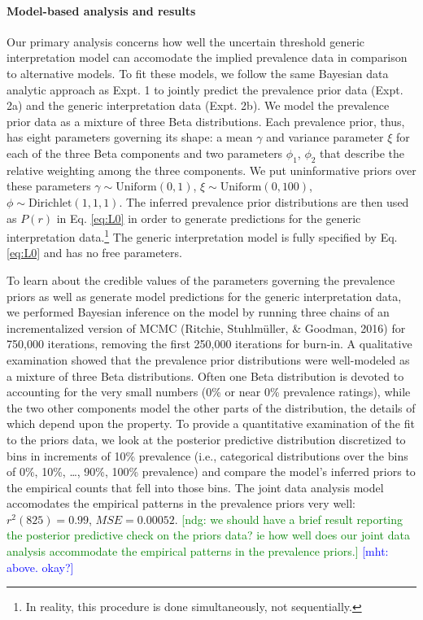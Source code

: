 \documentclass[,man,floatsintext]{apa6}
\let\oldparagraph\paragraph
\renewcommand{\paragraph}[1]{\oldparagraph{#1}\mbox{}}
\let\rmarkdownfootnote\footnote%
\def\footnote{\protect\rmarkdownfootnote}
\theoremstyle{definition}
\theoremstyle{definition}
\theoremstyle{definition}
\theoremstyle{remark}
\begin{document}
\hypertarget{model-based-analysis-and-results-1}{%
\paragraph{Model-based analysis and
results}\label{model-based-analysis-and-results-1}}

Our primary analysis concerns how well the uncertain threshold generic
interpretation model can accomodate the implied prevalence data in
comparison to alternative models. To fit these models, we follow the
same Bayesian data analytic approach as Expt. 1 to jointly predict the
prevalence prior data (Expt. 2a) and the generic interpretation data
(Expt. 2b). We model the prevalence prior data as a mixture of three
Beta distributions. Each prevalence prior, thus, has eight parameters
governing its shape: a mean \(\gamma\) and variance parameter \(\xi\)
for each of the three Beta components and two parameters \(\phi_1\),
\(\phi_2\) that describe the relative weighting among the three
components. We put uninformative priors over these parameters
\(\gamma \sim \text{Uniform}(0, 1)\),
\(\xi \sim \text{Uniform}(0, 100)\),
\(\phi \sim \text{Dirichlet}(1,1,1)\). The inferred prevalence prior
distributions are then used as \(P(r)\) in Eq. \ref{eq:L0} in order to
generate predictions for the generic interpretation data.\footnote{In
  reality, this procedure is done simultaneously, not sequentially.} The
generic interpretation model is fully specified by Eq. \ref{eq:L0} and
has no free parameters.

To learn about the credible values of the parameters governing the
prevalence priors as well as generate model predictions for the generic
interpretation data, we performed Bayesian inference on the model by
running three chains of an incrementalized version of MCMC (Ritchie,
Stuhlmüller, \& Goodman, 2016) for 750,000 iterations, removing the
first 250,000 iterations for burn-in. A qualitative examination showed
that the prevalence prior distributions were well-modeled as a mixture
of three Beta distributions. Often one Beta distribution is devoted to
accounting for the very small numbers (0\% or near 0\% prevalence
ratings), while the two other components model the other parts of the
distribution, the details of which depend upon the property. To provide
a quantitative examination of the fit to the priors data, we look at the
posterior predictive distribution discretized to bins in increments of
10\% prevalence (i.e., categorical distributions over the bins of 0\%,
10\%, \ldots{}, 90\%, 100\% prevalence) and compare the model's inferred
priors to the empirical counts that fell into those bins. The joint data
analysis model accomodates the empirical patterns in the prevalence
priors very well: \(r^2(825) = 0.99\), \(MSE = 0.00052\).
{\textcolor{Green}{[ndg: we should have a brief result reporting the posterior predictive check on the priors data? ie how well does our joint data analysis accommodate the empirical patterns in the prevalence priors.]}}
{\textcolor{Blue}{[mht: above. okay?]}}
\end{document}
